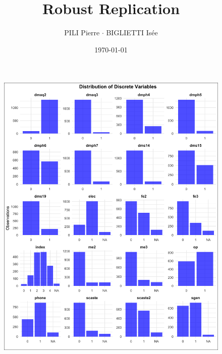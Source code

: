 \documentclass[12pt]{article}
\title{Robust Replication}
\author{PILI Pierre $\cdot$ BIGLIETTI Isée}
\date{\today}
\begin{document}
\maketitle


\begin{figure}[p]  %
    \centering
    \includegraphics[width=1\textwidth]{OUTPUT/MEDIA/score_bar.png}  %
    \label{fig:bar}
\end{figure}
\end{document}
